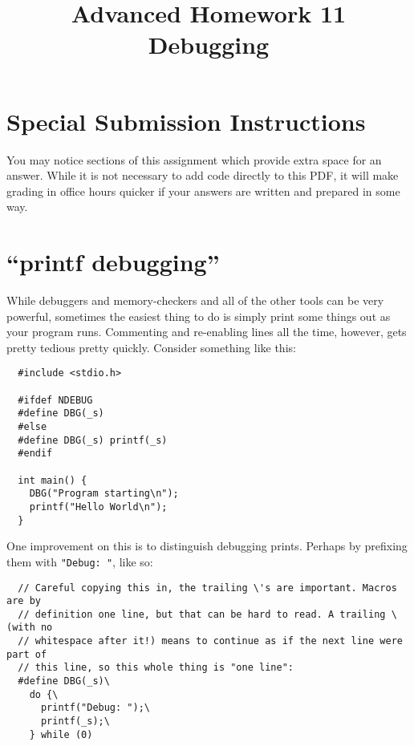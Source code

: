 \documentclass{article}
\begin{document}
\fancyfoot[C]{\color{gray} \thepage~/~\pageref*{LastPage}}
\pagestyle{fancyplain}

\title{\textbf{Advanced Homework 11\\Debugging}}
\author{\textbf{\color{red}{Due: Wednesday, March 28th, 11:59PM (Hard Deadline)}}}
\date{}
\maketitle

\section*{Special Submission Instructions}
You may notice sections of this assignment which provide extra space for an
answer. While it is not necessary to add code directly to this PDF, it will
make grading in office hours quicker if your answers are written and prepared
in some way.

\newpage


\section{``printf debugging''}

While debuggers and memory-checkers and all of the other tools can be very
powerful, sometimes the easiest thing to do is simply print some things out as
your program runs. Commenting and re-enabling lines all the time, however,
gets pretty tedious pretty quickly. Consider something like this:

\begin{lstlisting}
  #include <stdio.h>

  #ifdef NDEBUG
  #define DBG(_s)
  #else
  #define DBG(_s) printf(_s)
  #endif

  int main() {
    DBG("Program starting\n");
    printf("Hello World\n");
  }
\end{lstlisting}

One improvement on this is to distinguish debugging prints. Perhaps by
prefixing them with \texttt{"Debug: "}, like so:

\begin{lstlisting}
  // Careful copying this in, the trailing \'s are important. Macros are by
  // definition one line, but that can be hard to read. A trailing \ (with no
  // whitespace after it!) means to continue as if the next line were part of
  // this line, so this whole thing is "one line":
  #define DBG(_s)\
    do {\
      printf("Debug: ");\
      printf(_s);\
    } while (0)
\end{lstlisting}
\end{document}
